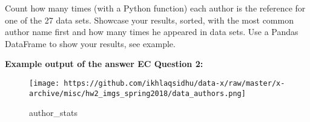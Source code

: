 \documentclass[11pt]{article}
\makeatletter
\def\maxwidth{\ifdim\Gin@nat@width>\linewidth\linewidth
    \else\Gin@nat@width\fi}
\let\Oldincludegraphics\includegraphics
\renewcommand{\includegraphics}[1]{\Oldincludegraphics[width=.8\maxwidth]{#1}}
\makeatother
\begin{document}
Count how many times (with a Python function) each author is the
reference for one of the 27 data sets. Showcase your results, sorted,
with the most common author name first and how many times he appeared in
data sets. Use a Pandas DataFrame to show your results, see example.

\textbf{Example output of the answer EC Question 2:}

\begin{figure}
\centering
\texttt{[image: https://github.com/ikhlaqsidhu/data-x/raw/master/x-archive/misc/hw2\_imgs\_spring2018/data\_authors.png]}
\caption{author\_stats}
\end{figure}


    
    
    
    
\end{document}
